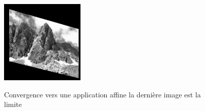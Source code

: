\begin{figure}[h!]
{		{\includegraphics[width=40mm]{test_homo_conv9.png}}}\\
		\caption{Convergence vers une application affine la dernière image est la limite}
\label{image_converge_building}
\end{figure}
